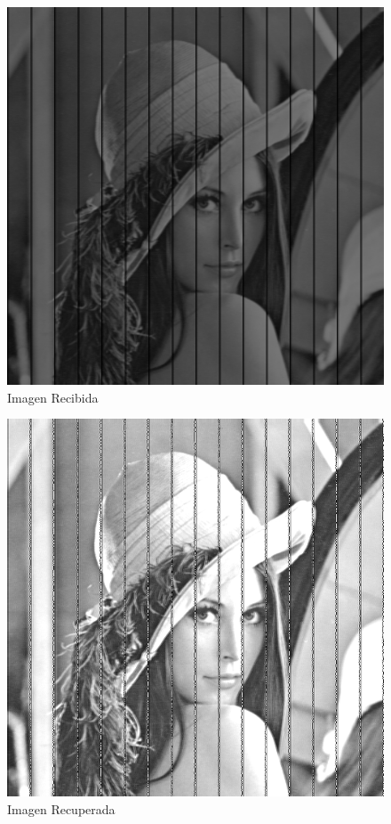 \documentclass{article}
\begin{document}
\begin{multicols}{2}
\begin{figure}[H]
\centering
\includegraphics[scale=0.2]{../img/received_part5b.png}
\caption{Imagen Recibida}

\end{figure}

\begin{figure}[H]
\centering
\includegraphics[scale=0.2]{../img/corrected_part5b.png}
\caption{Imagen Recuperada}


\end{figure}
\end{multicols}
\end{document}

